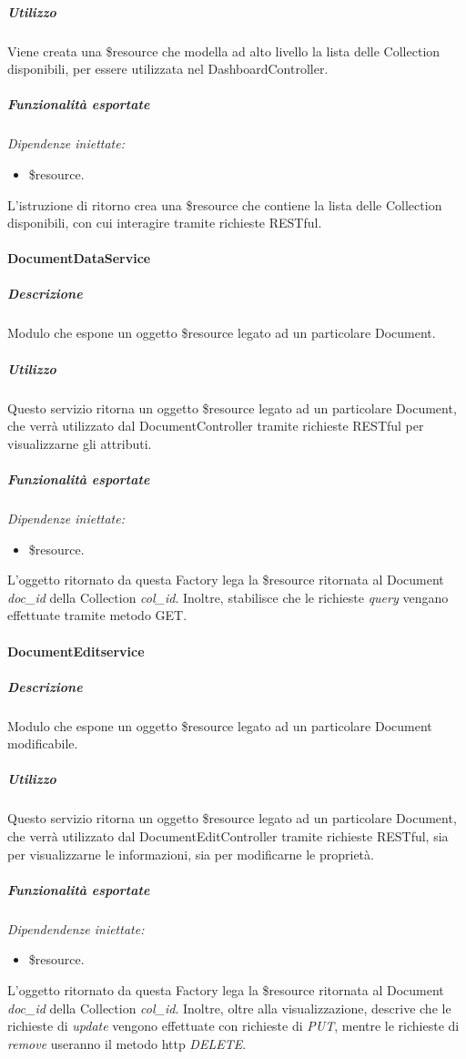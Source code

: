 \subparagraph{Utilizzo}
Viene creata una \$resource che modella ad alto livello la lista delle Collection disponibili,
per essere utilizzata nel DashboardController.

\subparagraph{Funzionalità esportate}
\emph{Dipendenze iniettate:}
\begin{itemize}
 \item \$resource.
\end{itemize}
L'istruzione di ritorno crea una \$resource che contiene la lista delle Collection disponibili, con 
cui interagire tramite richieste RESTful.

\paragraph{DocumentDataService}
\subparagraph{Descrizione}
Modulo che espone un oggetto \$resource legato ad un particolare Document.

\subparagraph{Utilizzo}
Questo servizio ritorna un oggetto \$resource legato ad un particolare Document, che verrà
utilizzato dal DocumentController tramite richieste RESTful per visualizzarne gli attributi.

\subparagraph{Funzionalità esportate}
\emph{Dipendenze iniettate:}
\begin{itemize}
 \item \$resource.
\end{itemize}
L'oggetto ritornato da questa Factory lega la \$resource ritornata al Document \emph{doc\_id} della Collection
\emph{col\_id}. Inoltre, stabilisce che le richieste \emph{query} vengano effettuate tramite metodo GET. 

\paragraph{DocumentEditservice}
\subparagraph{Descrizione}
Modulo che espone un oggetto \$resource legato ad un particolare Document modificabile.

\subparagraph{Utilizzo}
Questo servizio ritorna un oggetto \$resource legato ad un particolare Document, che verrà
utilizzato dal DocumentEditController tramite richieste RESTful, sia per visualizzarne
le informazioni, sia per modificarne le proprietà.

\subparagraph{Funzionalità esportate}
\emph{Dipendendenze iniettate:}
\begin{itemize}
 \item \$resource.
\end{itemize}
L'oggetto ritornato da questa Factory lega la \$resource ritornata al Document \emph{doc\_id} della Collection
\emph{col\_id}. Inoltre, oltre alla visualizzazione, descrive che le richieste di \emph{update} vengono effettuate
con richieste di \emph{PUT}, mentre le richieste di \emph{remove} useranno il metodo http \emph{DELETE}.


